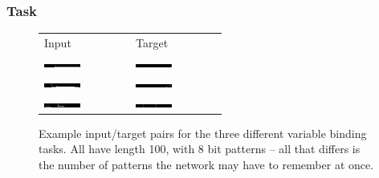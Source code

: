 \subsubsection{Task}

\begin{figure}
\centering
	\begin{tabu} to \textwidth {XX}
		Input & Target \\
		\includegraphics[width=0.45\textwidth, interpolate=false]{exps/vbind/100x1input} & 
		\includegraphics[width=0.45\textwidth, interpolate=false]{exps/vbind/100x1target} \\
		\includegraphics[width=0.45\textwidth, interpolate=false]{exps/vbind/100x2input} & 
		\includegraphics[width=0.45\textwidth, interpolate=false]{exps/vbind/100x2target} \\
		\includegraphics[width=0.45\textwidth, interpolate=false]{exps/vbind/100x3input} & 
		\includegraphics[width=0.45\textwidth, interpolate=false]{exps/vbind/100x3target} \\
	\end{tabu}
	\caption[Example instances of variable binding]{Example input/target pairs for the three
	different variable binding tasks. All have length 100, with 8 bit patterns -- all that differs
	is the number of patterns the network may have to remember at once.}
	\label{fig:vbinddata}
\end{figure}

